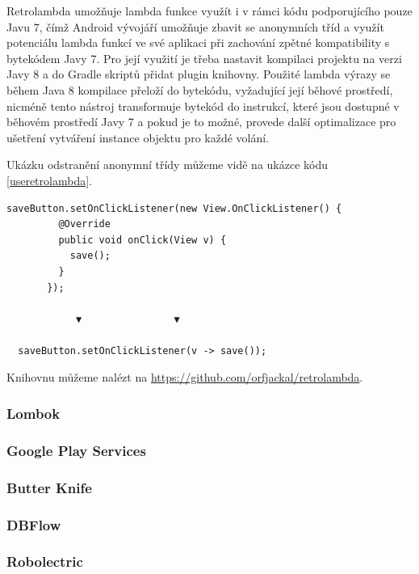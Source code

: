 \documentclass{article}
\begin{document}
Retrolambda umožňuje lambda funkce využít i v rámci kódu podporujícího pouze Javu 7,
čímž Android vývojáří umožňuje zbavit se anonymních tříd a využít potenciálu lambda funkcí
ve své aplikaci při zachování zpětné kompatibility s bytekódem Javy 7. Pro její využití je třeba
nastavit kompilaci projektu na verzi Javy 8 a do Gradle skriptů přidat plugin knihovny. Použité
lambda výrazy se během Java 8 kompilace přeloží do bytekódu, vyžadující její běhové prostředí,
nicméně tento nástroj transformuje bytekód do instrukcí, které jsou dostupné v běhovém prostředí
Javy 7 a pokud je to možné, provede další optimalizace pro ušetření vytváření instance objektu
pro každé volání.

Ukázku odstranění anonymní třídy můžeme vidě na ukázce kódu \ref{useretrolambda}.

\begin{lstlisting}[label=useretrolambda,caption=Odstrnění kódu anonymní třídy pomocí knihovny Retrolambda]
   saveButton.setOnClickListener(new View.OnClickListener() {
         @Override
         public void onClick(View v) {
           save();
         }
       });

            ▼                ▼

  saveButton.setOnClickListener(v -> save());
\end{lstlisting}

Knihovnu můžeme nalézt na \url{https://github.com/orfjackal/retrolambda}.

\subsubsection{Lombok}

\subsubsection{Google Play Services}

\subsubsection{Butter Knife}

\subsubsection{DBFlow}

\subsubsection{Robolectric}
\end{document}
